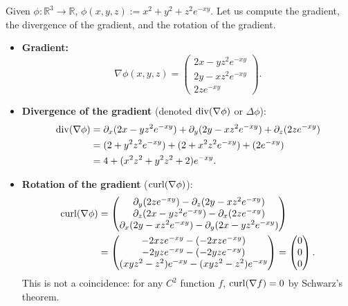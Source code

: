 \begin{example}
\label{ex:compute_operators}
Given $\phi : \mathbb{R}^3 \to \mathbb{R}$, $\phi(x,y,z) := x^2 + y^2 + z^2 e^{-xy}$.
Let us compute the gradient, the divergence of the gradient, and the rotation of the gradient.
\begin{itemize}
    \item \textbf{Gradient:}
    \[\nabla \phi(x,y,z) = \begin{pmatrix} 2x - yz^2 e^{-xy} \\ 2y - xz^2 e^{-xy} \\ 2z e^{-xy} \end{pmatrix}.\]
    
    \item \textbf{Divergence of the gradient} (denoted $\operatorname{div}(\nabla \phi)$ or $\Delta \phi$):
    \begin{align*}
    \operatorname{div}(\nabla \phi) &= \partial_x(2x - yz^2 e^{-xy}) + \partial_y(2y - xz^2 e^{-xy}) + \partial_z(2z e^{-xy}) \\
    &= (2 + y^2 z^2 e^{-xy}) + (2 + x^2 z^2 e^{-xy}) + (2 e^{-xy}) \\
    &= 4 + (x^2 z^2 + y^2 z^2 + 2) e^{-xy}.
    \end{align*}
    
    \item \textbf{Rotation of the gradient} ($\operatorname{curl}(\nabla \phi)$):
    \begin{align*}
    \operatorname{curl}(\nabla \phi) &= \begin{pmatrix} \partial_y(2z e^{-xy}) - \partial_z(2y - xz^2 e^{-xy}) \\ \partial_z(2x - yz^2 e^{-xy}) - \partial_x(2z e^{-xy}) \\ \partial_x(2y - xz^2 e^{-xy}) - \partial_y(2x - yz^2 e^{-xy}) \end{pmatrix} \\
    &= \begin{pmatrix} -2xz e^{-xy} - (-2xz e^{-xy}) \\ -2yz e^{-xy} - (-2yz e^{-xy}) \\ (xyz^2 - z^2) e^{-xy} - (xyz^2 - z^2) e^{-xy} \end{pmatrix} = \begin{pmatrix} 0 \\ 0 \\ 0 \end{pmatrix}.
    \end{align*}
    This is not a coincidence: for any $C^2$ function $f$, $\operatorname{curl}(\nabla f) = 0$ by Schwarz's theorem.
\end{itemize}
\end{example}

